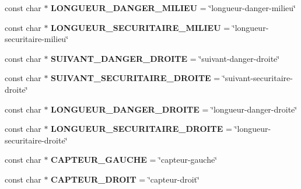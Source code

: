 \begin{DoxyCompactItemize}
\item 
const char $\ast$ {\bfseries L\+O\+N\+G\+U\+E\+U\+R\+\_\+\+D\+A\+N\+G\+E\+R\+\_\+\+M\+I\+L\+I\+EU} = \char`\"{}longueur-\/danger-\/milieu\char`\"{}\hypertarget{class_element_x_m_l_a3cbaad2b9125d75b6ff744a2b80b1f0d}{}\label{class_element_x_m_l_a3cbaad2b9125d75b6ff744a2b80b1f0d}

\item 
const char $\ast$ {\bfseries L\+O\+N\+G\+U\+E\+U\+R\+\_\+\+S\+E\+C\+U\+R\+I\+T\+A\+I\+R\+E\+\_\+\+M\+I\+L\+I\+EU} = \char`\"{}longueur-\/securitaire-\/milieu\char`\"{}\hypertarget{class_element_x_m_l_adec8f24ca9c049cc72564479276ef778}{}\label{class_element_x_m_l_adec8f24ca9c049cc72564479276ef778}

\item 
const char $\ast$ {\bfseries S\+U\+I\+V\+A\+N\+T\+\_\+\+D\+A\+N\+G\+E\+R\+\_\+\+D\+R\+O\+I\+TE} = \char`\"{}suivant-\/danger-\/droite\char`\"{}\hypertarget{class_element_x_m_l_a1ee246e8b9353a33c4f3364f7c141ffd}{}\label{class_element_x_m_l_a1ee246e8b9353a33c4f3364f7c141ffd}

\item 
const char $\ast$ {\bfseries S\+U\+I\+V\+A\+N\+T\+\_\+\+S\+E\+C\+U\+R\+I\+T\+A\+I\+R\+E\+\_\+\+D\+R\+O\+I\+TE} = \char`\"{}suivant-\/securitaire-\/droite\char`\"{}\hypertarget{class_element_x_m_l_a002e3e43e98698c5d546631e4643e27a}{}\label{class_element_x_m_l_a002e3e43e98698c5d546631e4643e27a}

\item 
const char $\ast$ {\bfseries L\+O\+N\+G\+U\+E\+U\+R\+\_\+\+D\+A\+N\+G\+E\+R\+\_\+\+D\+R\+O\+I\+TE} = \char`\"{}longueur-\/danger-\/droite\char`\"{}\hypertarget{class_element_x_m_l_ae1f671029300c7004772481af81e558b}{}\label{class_element_x_m_l_ae1f671029300c7004772481af81e558b}

\item 
const char $\ast$ {\bfseries L\+O\+N\+G\+U\+E\+U\+R\+\_\+\+S\+E\+C\+U\+R\+I\+T\+A\+I\+R\+E\+\_\+\+D\+R\+O\+I\+TE} = \char`\"{}longueur-\/securitaire-\/droite\char`\"{}\hypertarget{class_element_x_m_l_ac749b0c53d69d05896fceba2bdd986dd}{}\label{class_element_x_m_l_ac749b0c53d69d05896fceba2bdd986dd}

\item 
const char $\ast$ {\bfseries C\+A\+P\+T\+E\+U\+R\+\_\+\+G\+A\+U\+C\+HE} = \char`\"{}capteur-\/gauche\char`\"{}\hypertarget{class_element_x_m_l_aa7c9a1c7fe28cd4ed328f0d4df8956ad}{}\label{class_element_x_m_l_aa7c9a1c7fe28cd4ed328f0d4df8956ad}

\item 
const char $\ast$ {\bfseries C\+A\+P\+T\+E\+U\+R\+\_\+\+D\+R\+O\+IT} = \char`\"{}capteur-\/droit\char`\"{}\hypertarget{class_element_x_m_l_ac03ab9039aa441b14774f3a25290fd93}{}\label{class_element_x_m_l_ac03ab9039aa441b14774f3a25290fd93}


\end{DoxyCompactItemize}
